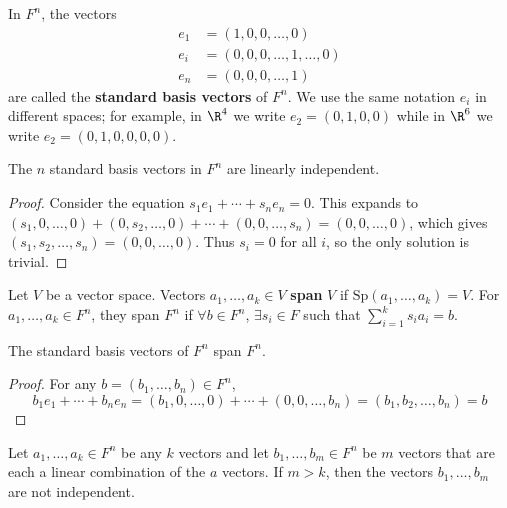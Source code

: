 \begin{definition}\label{def:standard-basis}
    In $F^n$, the vectors
    \begin{align*}
    e_1 &= (1, 0, 0, \ldots, 0) \\
    e_i &= (0, 0, 0, \ldots, 1, \ldots, 0) \\
    e_n &= (0, 0, 0, \ldots, 1)
    \end{align*}
    are called the \textbf{standard basis vectors} of $F^n$. We use the same notation $e_i$ in different spaces; for example, in $\R^4$ we write $e_2 = (0,1,0,0)$ while in $\R^6$ we write $e_2 = (0,1,0,0,0,0)$.
\end{definition}

\begin{theorem}\label{thm:standard-basis-independent}
    The $n$ standard basis vectors in $F^n$ are linearly independent.
\end{theorem}

\begin{proof}
    Consider the equation $s_1 e_1 + \cdots + s_n e_n = 0$. This expands to $(s_1, 0, \ldots, 0) + (0, s_2, \ldots, 0) + \cdots + (0, 0, \ldots, s_n) = (0, 0, \ldots, 0)$, which gives $(s_1, s_2, \ldots, s_n) = (0, 0, \ldots, 0)$. Thus $s_i = 0$ for all $i$, so the only solution is trivial.
\end{proof}


\begin{definition}
    Let $V$ be a vector space. Vectors $a_1, \ldots, a_k \in V$ \textbf{span} $V$ if $\mathrm{Sp}(a_1, \ldots, a_k) = V$. For $a_1, \ldots, a_k \in F^n$, they span $F^n$ if $\forall b \in F^n$, $\exists s_i \in F$ such that $\sum_{i=1}^{k} s_i a_i = b$.
\end{definition}

\begin{theorem}\label{thm:standard-basis-span}
    The standard basis vectors of $F^n$ span $F^n$.
\end{theorem}

\begin{proof}
    For any $b = (b_1, \ldots, b_n) \in F^n$,
    \[
    b_1 e_1 + \cdots + b_n e_n = (b_1, 0, \ldots, 0) + \cdots + (0, 0, \ldots, b_n) = (b_1, b_2, \ldots, b_n) = b
    \]
\end{proof}

\begin{lemma}\label{lem:dependent-combinations}
    Let $a_1, \ldots, a_k \in F^n$ be any $k$ vectors and let $b_1, \ldots, b_m \in F^n$ be $m$ vectors that are each a linear combination of the $a$ vectors. If $m > k$, then the vectors $b_1, \ldots, b_m$ are not independent.
\end{lemma}

